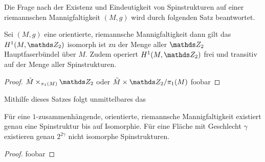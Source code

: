 Die Frage nach der Existenz und Eindeutigkeit von Spinstrukturen 
auf einer riemannschen Mannigfaltigkeit $ (M,g) $ wird durch folgenden
Satz beantwortet.

\begin{Satz}\label{anzahlspin}
	Sei $ (M,g) $ eine orientierte, riemannsche Mannigfaltigkeit dann
	gilt das $ H^1(M,\Z_2) $ isomorph ist zu der Menge aller $ \Z_2 $
	Hauptfaserbündel über $ M $. Zudem operiert $ H^1(M,\Z_2) $ frei
	und transitiv auf der Menge aller Spinstrukturen. 
	\begin{proof}
		$ \tilde{M} \times_{\pi_1(M)} \Z_2 $
		oder
		$ \tilde{M} \times \Z_2 / \pi_1(M)$
		foobar 
	\end{proof}
\end{Satz}

Mithilfe dieses Satzes folgt unmittelbares das
\begin{Kor}
	Für eine $ 1 $-zusammenhängende, orientierte, riemannsche Mannigfaltigkeit existiert genau eine Spinstruktur bis auf Isomorphie. Für eine Fläche mit Geschlecht $ \gamma $ existieren
	genau $ 2^{2\gamma} $ nicht isomorphe Spinstrukturen.
	\begin{proof}
		foobar
	\end{proof}
\end{Kor}


